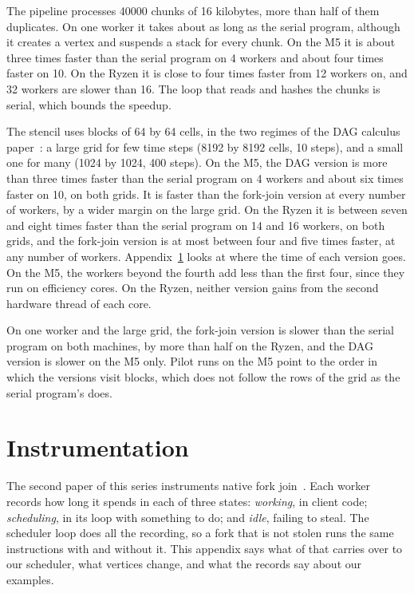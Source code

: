 \documentclass[sigplan,nonacm]{acmart}
\begin{document}
The pipeline processes 40000 chunks of 16 kilobytes, more than half
of them duplicates.
%
On one worker it takes about as long as the serial program, although
it creates a vertex and suspends a stack for every chunk.
%
On the M5 it is about three times faster than the serial program on
4 workers and about four times faster on 10.
%
On the Ryzen it is close to four times faster from 12 workers on, and
32 workers are slower than 16.
%
The loop that reads and hashes the chunks is serial, which bounds the
speedup.

The stencil uses blocks of 64 by 64 cells, in the two regimes of the
DAG calculus paper~\cite{Dag_calculus_16}: a large grid for few time
steps (8192 by 8192 cells, 10 steps), and a small one for many (1024
by 1024, 400 steps).
%
On the M5, the DAG version is more than three times faster than the
serial program on 4 workers and about six times faster on 10, on
both grids.
%
It is faster than the fork-join version at every number of workers,
by a wider margin on the large grid.
%
On the Ryzen it is between seven and eight times faster than the
serial program on 14 and 16 workers, on both grids, and the fork-join
version is at most between four and five times faster, at any number
of workers.
%
Appendix~\ref{sec:instr} looks at where the time of each version
goes.
%
On the M5, the workers beyond the fourth add less than the first
four, since they run on efficiency cores.
%
On the Ryzen, neither version gains from the second hardware thread
of each core.

On one worker and the large grid, the fork-join version is slower
than the serial program on both machines, by more than half on the
Ryzen, and the DAG version is slower on the M5 only.
%
Pilot runs on the M5 point to the order in which the
versions visit blocks, which does not follow the rows of the grid as
the serial program's does.

\section{Instrumentation}
\label{sec:instr}

The second paper of this series instruments native fork
join~\cite{instrumentation}.
%
Each worker records how long it spends in each of three states:
\emph{working}, in client code; \emph{scheduling}, in its loop with
something to do; and \emph{idle}, failing to steal.
%
The scheduler loop does all the recording, so a fork that is not
stolen runs the same instructions with and without it.
%
This appendix says what of that carries over to our scheduler, what
vertices change, and what the records say about our examples.
\end{document}

